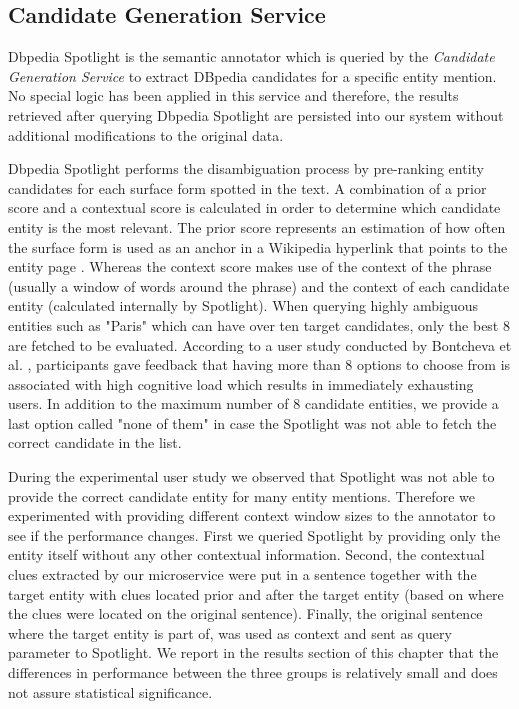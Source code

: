 \subsection{Candidate Generation Service}
Dbpedia Spotlight is the semantic annotator which is queried by the \textit{Candidate Generation Service} to extract DBpedia candidates for a specific entity mention. No special logic has been applied in this service and therefore, the results retrieved after querying Dbpedia Spotlight are persisted into our system without additional modifications to the original data.

Dbpedia Spotlight \cite{dbpedia} performs the disambiguation process by pre-ranking entity candidates for each surface form spotted in the text. A combination of a prior score and a contextual score is calculated in order to determine which candidate entity is the most relevant. The prior score represents an estimation of how often the surface form is used as an anchor in a Wikipedia hyperlink that points to the entity page \cite{39}. Whereas the context score makes use of the context of the phrase (usually a window of words around the phrase) and the context of each candidate entity (calculated internally by Spotlight). When querying highly ambiguous entities such as "Paris" which can have over ten target candidates, only the best 8 are fetched to be evaluated. According to a user study conducted by Bontcheva et al. \cite{33}, participants gave feedback that having more than 8 options to choose from is associated with high cognitive load which results in immediately exhausting users. In addition to the maximum number of 8 candidate entities, we provide a last option called "none of them" in case the Spotlight was not able to fetch the correct candidate in the list.

During the experimental user study we observed that Spotlight was not able to provide the correct candidate entity for many entity mentions. Therefore we experimented with providing different context window sizes to the annotator to see if the performance changes. First we queried Spotlight by providing only the entity itself without any other contextual information. Second, the contextual clues extracted by our microservice were put in a sentence together with the target entity with clues located prior and after the target entity (based on where the clues were located on the original sentence). Finally, the original sentence where the target entity is part of, was used as context and sent as query parameter to Spotlight. We report in the results section of this chapter that the differences in performance between the three groups is relatively small and does not assure statistical significance.